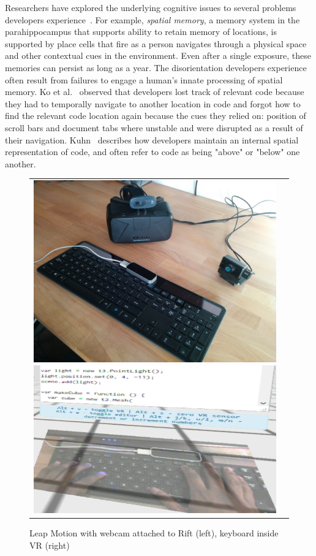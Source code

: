 \documentclass[conference]{IEEEtran}
\begin{document}
Researchers have explored the underlying cognitive issues to several problems developers experience~\cite{Parnin:2012}.
For example, \emph{spatial memory}, a memory system in the parahippocampus that supports ability to retain memory of locations, is supported by place cells that fire as a person navigates through a physical space and other contextual cues in the environment.  Even after a single exposure, these memories can persist as long as a year.  The disorientation developers experience often result from failures to engage a human's innate processing of spatial memory. Ko et al.~\cite{Ko:2006} observed that developers lost track of relevant code because they had to temporally navigate to another location in code and forgot how to find the relevant code location again because the cues they relied on: position of scroll bars and document tabs where unstable and were disrupted as a result of their navigation.  Kuhn~\cite{Kuhn:2010} describes how developers maintain an internal spatial representation of code, and often refer to code as being "above" or "below" one another.

\begin{figure}[ht]
\centering
\begin{tabular}{cc}
	\includegraphics[width=.45\linewidth]{figures/setup/equipment}\label{fig:rift}
 	\includegraphics[width=.45\linewidth]{figures/setup/webcam_passthrough}\label{fig:leap}
\end{tabular}
\caption{Leap Motion with webcam attached to Rift (left), keyboard inside VR (right)}
\end{figure}
\end{document}

